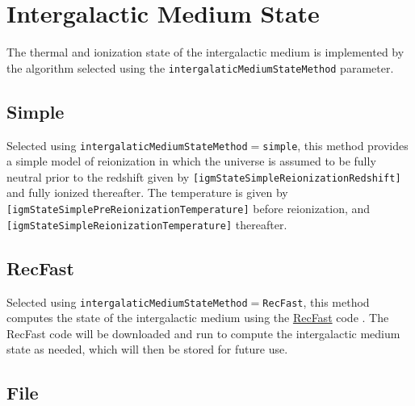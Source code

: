 \section{Intergalactic Medium State}\label{sec:IntergalacticMediumStateMethod}

The thermal and ionization state of the intergalactic medium is implemented by the algorithm selected using the {\tt intergalaticMediumStateMethod} parameter.

\subsection{Simple}\label{phys:intergalacticMediumState:intergalacticMediumStateSimple}

Selected using {\tt intergalaticMediumStateMethod}$=${\tt simple}, this method provides a simple model of reionization in which the universe is assumed to be fully neutral prior to the redshift given by {\tt [igmStateSimpleReionizationRedshift]} and fully ionized thereafter. The temperature is given by {\tt [igmStateSimplePreReionizationTemperature]} before reionization, and {\tt [igmStateSimpleReionizationTemperature]} thereafter.

\subsection{{\sc RecFast}}\label{phys:intergalacticMediumState:intergalacticMediumStateRecFast}

Selected using {\tt intergalaticMediumStateMethod}$=${\tt RecFast}, this method computes the state of the intergalactic medium using the \href{http://www.astro.ubc.ca/people/scott/recfast.html}{{\sc RecFast}} code \cite{seager_how_2000,wong_how_2008}. The {\sc RecFast} code will be downloaded and run to compute the intergalactic medium state as needed, which will then be stored for future use.

\subsection{File}\label{phys:intergalacticMediumState:intergalacticMediumStateFile}

